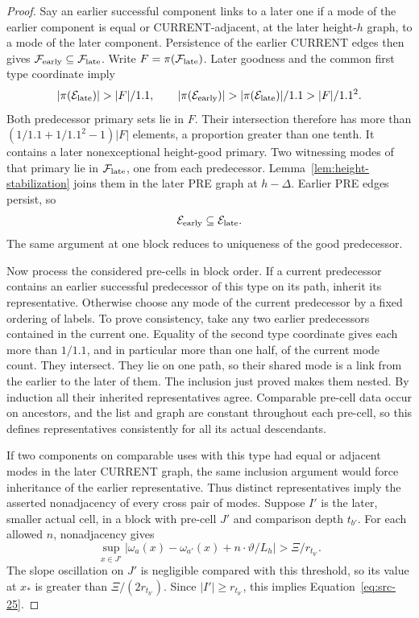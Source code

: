 \begin{proof}
Say an earlier successful component links to a later one if a mode
of the earlier component is equal or CURRENT-adjacent, at the later
height-\(h\) graph, to a mode of the later component.
Persistence of the earlier CURRENT edges then gives
\(\mathcal F_{\rm early}\subseteq\mathcal F_{\rm late}\).
Write \(F=\pi(\mathcal F_{\rm late})\).
Later goodness and the common first type coordinate imply
\[
 |\pi(\mathcal E_{\rm late})|>|F|/1.1,\qquad
 |\pi(\mathcal E_{\rm early})|
    >|\pi(\mathcal E_{\rm late})|/1.1
    >|F|/1.1^2 .
\]
Both predecessor primary sets lie in \(F\).
Their intersection therefore has more than
\((1/1.1+1/1.1^2-1)|F|\) elements, a proportion greater than
one tenth.  It contains a later nonexceptional height-good primary.
Two witnessing modes of that primary lie in
\(\mathcal F_{\rm late}\), one from each predecessor.
Lemma~\ref{lem:height-stabilization} joins them in the later PRE
graph at \(h-\Delta\).  Earlier PRE edges persist, so
\[
 \mathcal E_{\rm early}\subseteq\mathcal E_{\rm late}.
\]
The same argument at one block reduces to uniqueness of the good
predecessor.

Now process the considered pre-cells in block order.  If a current
predecessor contains an earlier successful predecessor of this
type on its path, inherit its representative.  Otherwise choose
any mode of the current predecessor by a fixed ordering of labels.
To prove consistency, take any two earlier predecessors contained
in the current one.  Equality of the second type coordinate gives
each more than \(1/1.1\), and in particular more than one half, of
the current mode count.  They intersect.  They lie on one path,
so their shared mode is a link from the earlier to the later of
them.  The inclusion just proved makes them nested.
By induction all their inherited representatives agree.
Comparable pre-cell data occur on ancestors, and the list and
graph are constant throughout each pre-cell, so this defines
representatives consistently for all its actual descendants.

If two components on comparable uses with this type had equal or
adjacent modes in the later CURRENT graph, the same inclusion
argument would force inheritance of the earlier representative.
Thus distinct representatives imply the asserted nonadjacency
of every cross pair of modes.
Suppose \(I'\) is the later, smaller actual cell, in a block with
pre-cell \(J'\) and comparison depth \(t_{b'}\).
For each allowed \(n\), nonadjacency gives
\[
 \sup_{x\in J'}
   |\omega_a(x)-\omega_{a'}(x)+n\cdot\vartheta/L_h|
       >\Xi/r_{t_{b'}}.
\]
The slope oscillation on \(J'\) is negligible compared with this
threshold, so its value at \(x_*\) is greater than
\(\Xi/(2r_{t_{b'}})\).
Since \(|I'|\ge r_{t_{b'}}\), this implies
Equation~\eqref{eq:src-25}.
\end{proof}

